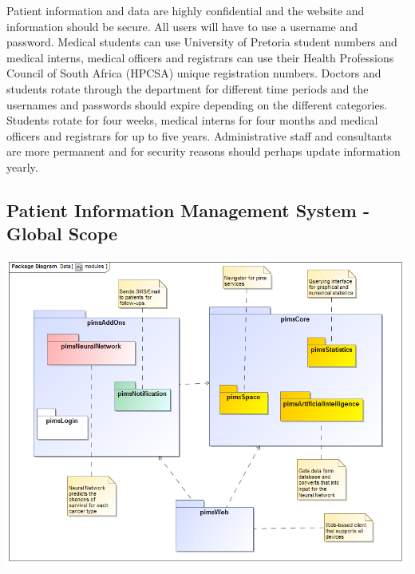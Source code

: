 Patient  information  and  data  are  highly  confidential  and  the  website  and 
information  should  be  secure.  All  users  will  have  to  use  a  username  and 
password. Medical students can use University of Pretoria student numbers and 
medical interns, medical officers and registrars can use their Health Professions 
Council  of  South  Africa  (HPCSA)  unique  registration  numbers.  Doctors  and 
students  rotate  through  the  department  for  different  time  periods  and  the 
usernames and passwords should expire depending on the different categories. 
Students  rotate  for  four  weeks,  medical  interns  for  four  months  and medical 
officers and registrars  for  up  to  five  years.  Administrative  staff  and  consultants 
are more permanent and for security reasons should perhaps update information 
yearly. \par


\subsection{Patient Information Management System - Global Scope}
\includegraphics[width=\linewidth]{./Graphics/globalImages/modules}
